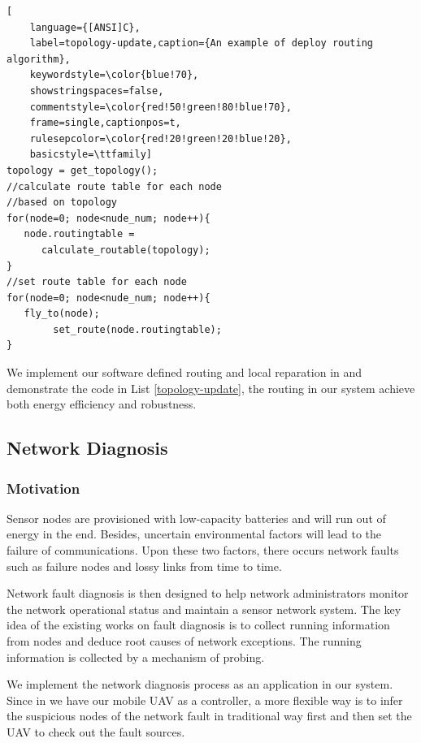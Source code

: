 \begin{lstlisting}[
	language={[ANSI]C},
	label=topology-update,caption={An example of deploy routing algorithm},
	keywordstyle=\color{blue!70},
	showstringspaces=false,
	commentstyle=\color{red!50!green!80!blue!70},
	frame=single,captionpos=t,
	rulesepcolor=\color{red!20!green!20!blue!20},
	basicstyle=\ttfamily]
topology = get_topology();
//calculate route table for each node
//based on topology
for(node=0; node<nude_num; node++){
   node.routingtable =
      calculate_routable(topology);
}
//set route table for each node
for(node=0; node<nude_num; node++){
   fly_to(node);
        set_route(node.routingtable);
}

\end{lstlisting}



We implement our software defined routing and local reparation in {\sdn} and demonstrate the code in List \ref{topology-update}, the routing in our system achieve both energy efficiency and robustness.


\subsection{Network Diagnosis}

\subsubsection{Motivation}

Sensor nodes are provisioned with low-capacity batteries and will run out of energy in the end. 
Besides, uncertain environmental factors will lead to the failure of communications.
Upon these two factors, there occurs network faults such as failure nodes and lossy links from time to time.

Network fault diagnosis is then designed to help network administrators monitor the network 
operational status and maintain a sensor network system. The key idea of the existing works
on fault diagnosis is to collect running information from nodes and deduce root causes of network
exceptions. The running information is collected by a mechanism of probing.

We implement the network diagnosis process as an application in our {\sdn} system.
Since in {\sdn} we have our mobile UAV as a controller, a more flexible way is to infer the suspicious 
nodes of the network fault in traditional way first and then set the UAV to check out the fault sources. 
 
